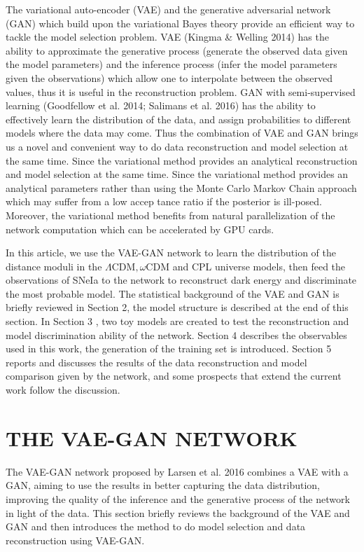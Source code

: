 \documentclass[10pt]{article}
\begin{document}
The variational auto-encoder (VAE) and the generative adversarial network (GAN) which build upon the variational Bayes theory provide an efficient way to tackle the model selection problem. VAE (Kingma \& Welling 2014) has the ability to approximate the generative process (generate the observed data given the model parameters) and the inference process (infer the model parameters given the observations) which allow one to interpolate between the observed values, thus it is useful in the reconstruction problem. GAN with semi-supervised learning (Goodfellow et al. 2014; Salimans et al. 2016) has the ability to effectively learn the distribution of the data, and assign probabilities to different models where the data may come. Thus the combination of VAE and GAN brings us a novel and convenient way to do data reconstruction and model selection at the same time. Since the variational method provides an analytical reconstruction and model selection at the same time. Since the variational method provides an analytical parameters rather than using the Monte Carlo Markov Chain approach which may suffer from a low accep tance ratio if the posterior is ill-posed. Moreover, the variational method benefits from natural parallelization of the network computation which can be accelerated by GPU cards.

In this article, we use the VAE-GAN network to learn the distribution of the distance moduli in the $\Lambda \mathrm{CDM}, \omega \mathrm{CDM}$ and CPL universe models, then feed the observations of SNeIa to the network to reconstruct dark energy and discriminate the most probable model. The statistical background of the VAE and GAN is briefly reviewed in Section 2, the model structure is described at the end of this section. In Section 3 , two toy models are created to test the reconstruction and model discrimination ability of the network. Section 4 describes the observables used in this work, the generation of the training set is introduced. Section 5 reports and discusses the results of the data reconstruction and model comparison given by the network, and some prospects that extend the current work follow the discussion.

\section{THE VAE-GAN NETWORK}
The VAE-GAN network proposed by Larsen et al. 2016 combines a VAE with a GAN, aiming to use the results in better capturing the data distribution, improving the quality of the inference and the generative process of the network in light of the data. This section briefly reviews the background of the VAE and GAN and then introduces the method to do model selection and data reconstruction using VAE-GAN.
\end{document}
